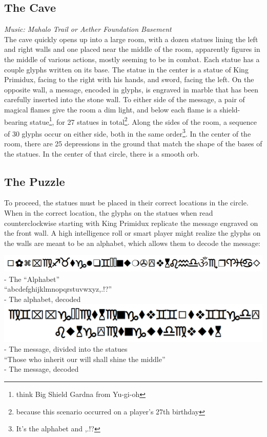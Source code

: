 \subsection{The Cave}
\textit{Music: Mahalo Trail or Aether Foundation Basement}\\
The cave quickly opens up into a large room, with a dozen statues lining the left and right walls and one placed near the middle of the room, apparently figures in the middle of various actions, mostly seeming to be in combat. Each statue has a couple glyphs written on its base. The statue in the center is a statue of King Primidux, facing to the right with his hands, and sword, facing the left. On the opposite wall, a message, encoded in glyphs, is engraved in marble that has been carefully inserted into the stone wall. To either side of the message, a pair of magical flames give the room a dim light, and below each flame is a shield-bearing statue\footnote{think Big Shield Gardna from Yu-gi-oh}, for 27 statues in total\footnote{because this scenario occurred on a player's 27th birthday}. Along the sides of the room, a sequence of 30 glyphs occur on either side, both in the same order\footnote{It's the alphabet and ,.!?}. In the center of the room, there are 25 depressions in the ground that match the shape of the bases of the statues. In the center of that circle, there is a smooth orb.

\subsection{The Puzzle}
To proceed, the statues must be placed in their correct locations in the circle. When in the correct location, the glyphs on the statues when read counterclockwise starting with King Primidux replicate the message engraved on the front wall. A high intelligence roll or smart player might realize the glyphs on the walls are meant to be an alphabet, which allows them to decode the message:
\begin{center}
\includegraphics[scale=0.5]{combats/alphabet.PNG}\\
- The ``Alphabet''\\

``abcdefghijklmnopqrstuvwxyz,.!?''\\
- The alphabet, decoded\\

\includegraphics[scale=0.5]{combats/message.PNG}\\
- The message, divided into the statues \\

``Those who inherit our will shall shine the middle''\\
- The message, decoded
\end{center}

